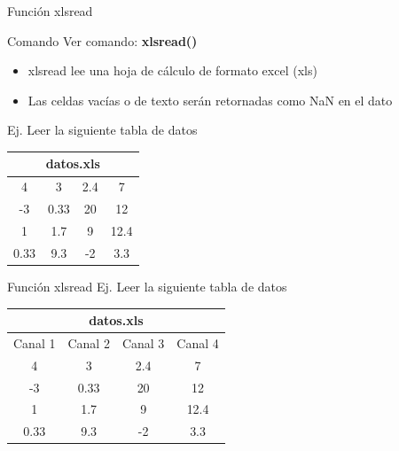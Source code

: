 \documentclass{bredelebeamer}
\begin{document}
\begin{frame}{Función xlsread}
\begin{exampleblock}{Comando}
Ver comando: \textbf{xlsread()}
\end{exampleblock}
\begin{itemize}
\item xlsread lee una hoja de cálculo de formato excel (xls)
\item Las celdas vacías o de texto serán retornadas como NaN en el dato
\end{itemize}
Ej. Leer la siguiente tabla de datos
\begin{table}[]
\centering
\begin{tabular}{cccc}
\multicolumn{4}{c}{datos.xls}                                                                                    \\ \hline
\multicolumn{1}{|c|}{4}    & \multicolumn{1}{c|}{3}    & \multicolumn{1}{c|}{2.4} & \multicolumn{1}{c|}{7}    \\ \hline
\multicolumn{1}{|c|}{-3}   & \multicolumn{1}{c|}{0.33} & \multicolumn{1}{c|}{20}  & \multicolumn{1}{c|}{12}   \\ \hline
\multicolumn{1}{|c|}{1}    & \multicolumn{1}{c|}{1.7}  & \multicolumn{1}{c|}{9}   & \multicolumn{1}{c|}{12.4} \\ \hline
\multicolumn{1}{|c|}{0.33} & \multicolumn{1}{c|}{9.3}  & \multicolumn{1}{c|}{-2}  & \multicolumn{1}{c|}{3.3}  \\ \hline
\end{tabular}
\end{table}
\end{frame}

\begin{frame}{Función xlsread}
Ej. Leer la siguiente tabla de datos
\begin{table}[]
\centering
\begin{tabular}{cccc}
\multicolumn{4}{c}{datos.xls}                                                                                              \\ \hline
\multicolumn{1}{|c|}{Canal 1} & \multicolumn{1}{c|}{Canal 2} & \multicolumn{1}{c|}{Canal 3} & \multicolumn{1}{c|}{Canal 4} \\ \hline
\multicolumn{1}{|c|}{4}      & \multicolumn{1}{c|}{3}      & \multicolumn{1}{c|}{2.4}    & \multicolumn{1}{c|}{7}       \\ \hline
\multicolumn{1}{|c|}{-3}     & \multicolumn{1}{c|}{0.33}   & \multicolumn{1}{c|}{20}     & \multicolumn{1}{c|}{12}      \\ \hline
\multicolumn{1}{|c|}{1}      & \multicolumn{1}{c|}{1.7}    & \multicolumn{1}{c|}{9}      & \multicolumn{1}{c|}{12.4}    \\ \hline
\multicolumn{1}{|c|}{0.33}   & \multicolumn{1}{c|}{9.3}    & \multicolumn{1}{c|}{-2}     & \multicolumn{1}{c|}{3.3}     \\ \hline
\end{tabular}
\end{table}
\end{frame}
\end{document}
